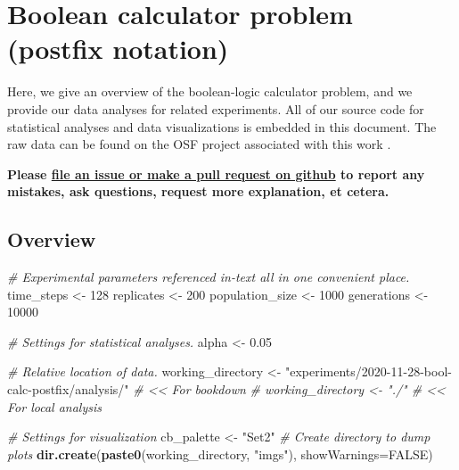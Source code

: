 \documentclass[]{book}
\newenvironment{Shaded}{\begin{snugshade}}{\end{snugshade}}
\newcommand{\CommentTok}[1]{\textcolor[rgb]{0.56,0.35,0.01}{\textit{#1}}}
\newcommand{\DataTypeTok}[1]{\textcolor[rgb]{0.13,0.29,0.53}{#1}}
\newcommand{\DecValTok}[1]{\textcolor[rgb]{0.00,0.00,0.81}{#1}}
\newcommand{\FloatTok}[1]{\textcolor[rgb]{0.00,0.00,0.81}{#1}}
\newcommand{\KeywordTok}[1]{\textcolor[rgb]{0.13,0.29,0.53}{\textbf{#1}}}
\newcommand{\NormalTok}[1]{#1}
\newcommand{\OtherTok}[1]{\textcolor[rgb]{0.56,0.35,0.01}{#1}}
\newcommand{\StringTok}[1]{\textcolor[rgb]{0.31,0.60,0.02}{#1}}
\begin{document}
\hypertarget{boolean-calculator-problem-postfix-notation}{%
\chapter{Boolean calculator problem (postfix notation)}\label{boolean-calculator-problem-postfix-notation}}

Here, we give an overview of the boolean-logic calculator problem, and we provide our data analyses for related experiments.
All of our source code for statistical analyses and data visualizations is embedded in this document.
The raw data can be found on the OSF project associated with this work \citep{Lalejini_Moreno_Ofria_Data_2020}.

\textbf{Please \href{https://github.com/amlalejini/Tag-based-Genetic-Regulation-for-LinearGP/issues}{file an issue or make a pull request on github} to report any mistakes, ask questions, request more explanation, et cetera.}

\hypertarget{overview-4}{%
\section{Overview}\label{overview-4}}

\begin{Shaded}
\begin{Highlighting}[]
\CommentTok{# Experimental parameters referenced in-text all in one convenient place.}
\NormalTok{time_steps <-}\StringTok{ }\DecValTok{128}
\NormalTok{replicates <-}\StringTok{ }\DecValTok{200}
\NormalTok{population_size <-}\StringTok{ }\DecValTok{1000}
\NormalTok{generations <-}\StringTok{ }\DecValTok{10000}

\CommentTok{# Settings for statistical analyses.}
\NormalTok{alpha <-}\StringTok{ }\FloatTok{0.05}

\CommentTok{# Relative location of data.}
\NormalTok{working_directory <-}\StringTok{ "experiments/2020-11-28-bool-calc-postfix/analysis/"} \CommentTok{# << For bookdown}
\CommentTok{# working_directory <- "./"                                              # << For local analysis}

\CommentTok{# Settings for visualization}
\NormalTok{cb_palette <-}\StringTok{ "Set2"}
\CommentTok{# Create directory to dump plots}
\KeywordTok{dir.create}\NormalTok{(}\KeywordTok{paste0}\NormalTok{(working_directory, }\StringTok{"imgs"}\NormalTok{), }\DataTypeTok{showWarnings=}\OtherTok{FALSE}\NormalTok{)}
\end{Highlighting}
\end{Shaded}
\end{document}
